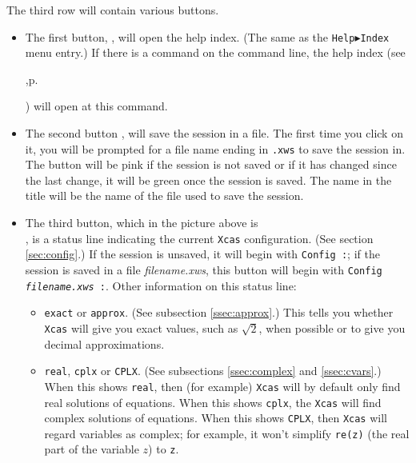 \documentclass[a4paper,11pt]{book}
\begin{document}
The third row will contain various buttons.
\begin{itemize}
  \item The first button, , will open the help index.
  (The same as the \texttt{Help$\blacktriangleright$Index} menu entry.)
  If there is a command on the command line, the help index 
  (see 
  \begin{latexonly},p.\pageref{sssec:helpind}\end{latexonly})
  will open at this command.
  
  \item The second button , will save the session
  in a file.  The first time you click on it, you will be prompted for
  a file name ending in \texttt{.xws} to save the session in.  The
  button will be pink if the session is not saved or if it has changed
  since the last change, it will be green once the session is saved.
  The name in the title will be the name of the file used to save the
  session.

\item The third button, which in the picture above is\\
  , is a status
  line indicating the current \texttt{Xcas} configuration. 
  (See section \ref{sec:config}.)
  If the session is unsaved, it will begin with \texttt{Config :}; if the
  session is saved in a file \textit{filename.xws}, this button will
  begin with \texttt{\texttt{Config }\textit{filename.xws}\texttt{ :}}.
  Other information on this status line:
  \begin{itemize}
    \item \texttt{exact} or \texttt{approx}.  
    (See subsection \ref{ssec:approx}.)
    This tells you whether
    \texttt{Xcas} will give you exact values, such as
    $\sqrt{2}$, when possible or to give you decimal approximations.

    \item \texttt{real}, \texttt{cplx} or \texttt{CPLX}.  
    (See subsections \ref{ssec:complex} and \ref{ssec:cvars}.)
    When this shows \texttt{real}, then (for example) \texttt{Xcas} will by
    default only find real solutions of equations.  When this shows
    \texttt{cplx}, the \texttt{Xcas} will find complex solutions of
    equations.  When this shows \texttt{CPLX}, then \texttt{Xcas} will
    regard variables as complex; for example, it won't simplify
    \texttt{re(z)} (the real part of the variable $z$) to \texttt{z}.


\end{itemize}
\end{itemize}
\end{document}
